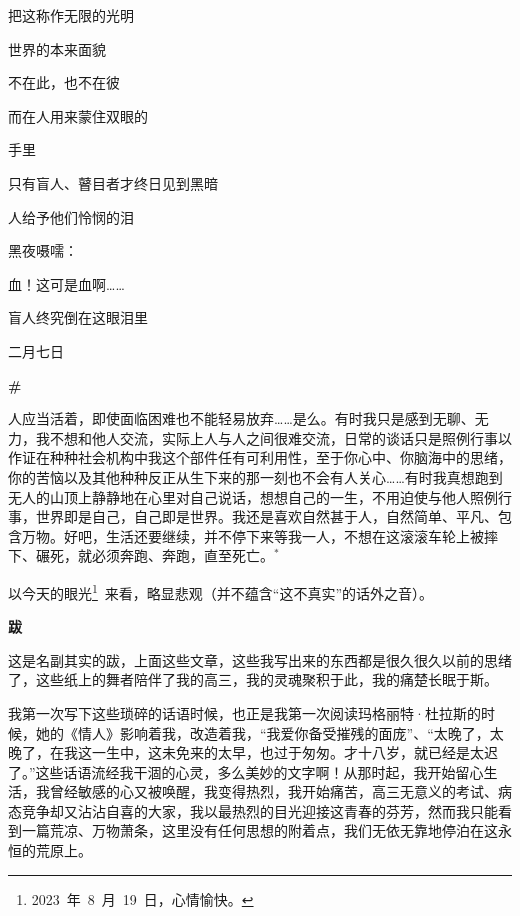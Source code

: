 \documentclass{ctexbook}
\begin{document}
    把这称作无限的光明


\mbox


    世界的本来面貌

    不在此，也不在彼

    而在人用来蒙住双眼的

    手里


\mbox


    只有盲人、瞽目者才终日见到黑暗

    人给予他们怜悯的泪

    黑夜嗫嚅：

    血！这可是血啊……


\mbox


    盲人终究倒在这眼泪里

    \hfill 二月七日

\newpage
\textbf{\#}


\mbox


    人应当活着，即使面临困难也不能轻易放弃……是么。有时我只是感到无聊、无力，我不想和他人交流，实际上人与人之间很难交流，日常的谈话只是照例行事以作证在种种社会机构中我这个部件任有可利用性，至于你心中、你脑海中的思绪，你的苦恼以及其他种种反正从生下来的那一刻也不会有人关心……有时我真想跑到无人的山顶上静静地在心里对自己说话，想想自己的一生，不用迫使与他人照例行事，世界即是自己，自己即是世界。我还是喜欢自然甚于人，自然简单、平凡、包含万物。好吧，生活还要继续，并不停下来等我一人，不想在这滚滚车轮上被摔下、碾死，就必须奔跑、奔跑，直至死亡。\(^*\)


\mbox


    {\normalsize *以今天的眼光\footnote{\normalsize 2023 年 8 月 19 日，心情愉快。} 来看，略显悲观（并不蕴含“这不真实”的话外之音）。}


\newpage
\textbf{跋}


\mbox


    这是名副其实的跋，上面这些文章，这些我写出来的东西都是很久很久以前的思绪了，这些纸上的舞者陪伴了我的高三，我的灵魂聚积于此，我的痛楚长眠于斯。

    我第一次写下这些琐碎的话语时候，也正是我第一次阅读玛格丽特·杜拉斯的时候，她的《情人》影响着我，改造着我，“我爱你备受摧残的面庞”、“太晚了，太晚了，在我这一生中，这未免来的太早，也过于匆匆。才十八岁，就已经是太迟了。”这些话语流经我干涸的心灵，多么美妙的文字啊！从那时起，我开始留心生活，我曾经敏感的心又被唤醒，我变得热烈，我开始痛苦，高三无意义的考试、病态竞争却又沾沾自喜的大家，我以最热烈的目光迎接这青春的芬芳，然而我只能看到一篇荒凉、万物萧条，这里没有任何思想的附着点，我们无依无靠地停泊在这永恒的荒原上。
\end{document}
